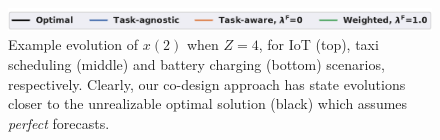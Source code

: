 \begin{figure}[ht]
\vskip 0.2in
\begin{center}
\includegraphics[width=0.8\columnwidth]{figures/evolution_legend.pdf}


\caption{Example evolution of $x(2)$ when $Z = 4$, for IoT (top), taxi scheduling (middle) and battery charging (bottom) scenarios, respectively. Clearly, our co-design approach has state evolutions closer to the unrealizable optimal solution (black) which assumes \textit{perfect} forecasts.}
\label{fig:state_evolution}
\end{center}
\vskip -0.2in
\end{figure}
